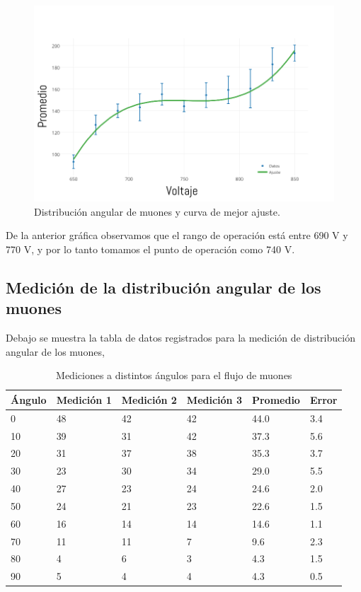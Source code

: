 \documentclass[a4paper,10pt]{article}
\numberwithin{equation}{section}
\begin{document}
\begin{figure}[H]
 \center 
 \includegraphics[scale=0.38]{atenuacionMuones1}
 \caption{Distribución angular de muones y curva de mejor ajuste.}
\end{figure}

De la anterior gráfica observamos que el rango de operación está entre 690 V y 770 V,
y por lo tanto tomamos el punto de operación como 740 V. 

\subsection{Medición de la distribución angular de los muones}

Debajo se muestra la tabla de datos registrados para la medición de distribución 
angular de los muones,

\begin{table}[H]
\centering
\caption{Mediciones a distintos ángulos para el flujo de muones}
\begin{tabular}{|l|l|l|l|l|l|}
\hline
Ángulo & Medición 1 & Medición 2 & Medición 3 & Promedio & Error \\ \hline
0      & 48        & 42        & 42        & 44.0     & 3.4   \\ \hline
10     & 39        & 31        & 42        & 37.3     & 5.6   \\ \hline
20     & 31        & 37        & 38        & 35.3     & 3.7   \\ \hline
30     & 23        & 30        & 34        & 29.0     & 5.5   \\ \hline
40     & 27        & 23        & 24        & 24.6     & 2.0   \\ \hline
50     & 24        & 21        & 23        & 22.6     & 1.5   \\ \hline
60     & 16        & 14        & 14        & 14.6     & 1.1   \\ \hline
70     & 11        & 11        & 7         & 9.6      & 2.3   \\ \hline
80     & 4         & 6         & 3         & 4.3      & 1.5   \\ \hline
90     & 5         & 4         & 4         & 4.3      & 0.5   \\ \hline
\end{tabular}
\end{table}
\end{document}
